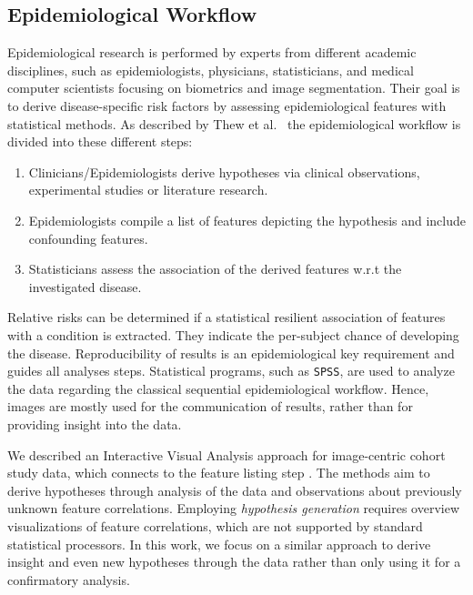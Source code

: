 \documentclass[journal]{style/vgtc} 			          %
\begin{document}
\subsection{Epidemiological Workflow} \label{sec:EpidemiologicalWorkflow}
Epidemiological research is performed by experts from different academic disciplines, such as epidemiologists, physicians, statisticians, and medical computer scientists focusing on biometrics and image segmentation.
Their goal is to derive disease-specific risk factors by assessing epidemiological features with statistical methods.
As described by Thew et al.~\cite{Thew2009} the epidemiological workflow is divided into these different steps:
\begin{enumerate}
	\item Clinicians/Epidemiologists derive hypotheses via clinical observations, experimental studies or literature research.
	\item Epidemiologists compile a list of features depicting the hypothesis and include confounding features.
	\item Statisticians assess the association of the derived features w.r.t the investigated disease.
\end{enumerate}
Relative risks can be determined if a statistical resilient association of features with a condition is extracted.
They indicate the per-subject chance of developing the disease.
Reproducibility of results is an epidemiological key requirement and guides all analyses steps.
Statistical programs, such as \texttt{SPSS}, are used to analyze the data regarding the classical sequential epidemiological workflow.
Hence, images are mostly used for the communication of results, rather than for providing insight into the data.

We described an Interactive Visual Analysis approach for image-centric cohort study data, which connects to the feature listing step \cite{Klemm2014VIS}.
The methods aim to derive hypotheses through analysis of the data and observations about previously unknown feature correlations.
Employing \emph{hypothesis generation} requires overview visualizations of feature correlations, which are not supported by standard statistical processors.
In this work, we focus on a similar approach to derive insight and even new hypotheses through the data rather than only using it for a confirmatory analysis.
\end{document}
